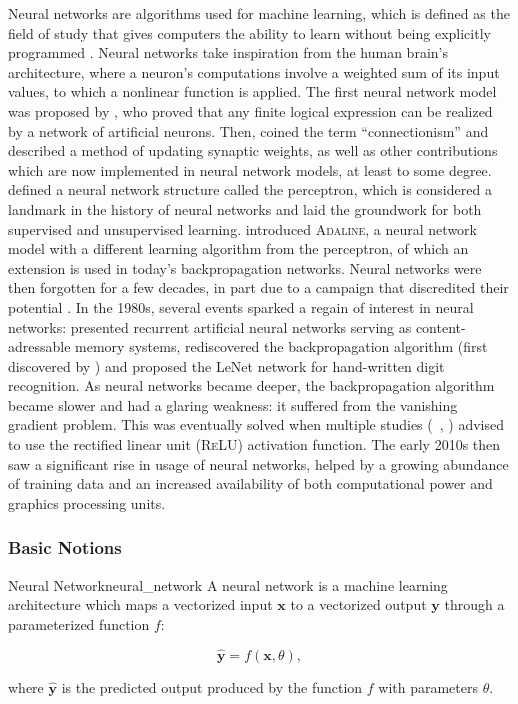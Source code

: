 Neural networks are algorithms used for machine learning, which is defined as the field of study that gives computers the ability to learn without being explicitly programmed \citep{samuel1959machine}. Neural networks take inspiration from the human brain's architecture, where a neuron's computations involve a weighted sum of its input values, to which a nonlinear function is applied. The first neural network model was proposed by \citet{mcculloch1943logical}, who proved that any finite logical expression can be realized by a network of artificial neurons. Then, \citet{hebb1949organization} coined the term ``connectionism'' and described a method of updating synaptic weights, as well as other contributions which are now implemented in neural network models, at least to some degree. \citet{rosenblatt1958perceptron} defined a neural network structure called the perceptron, which is considered a landmark in the history of neural networks and laid the groundwork for both supervised and unsupervised learning. \citet{widrow1960adaptive} introduced \textsc{Adaline}, a neural network model with a different learning algorithm from the perceptron, of which an extension is used in today's backpropagation networks. Neural networks were then forgotten for a few decades, in part due to a campaign that discredited their potential \citep{minsky1969introduction}. In the 1980s, several events sparked a regain of interest in neural networks: \citet{hopfield1982neural} presented recurrent artificial neural networks serving as content-adressable memory systems, \citet{rumelhart1985learning} rediscovered the backpropagation algorithm (first discovered by \citet{werbos1974beyond}) and \cite{le1989handwritten} proposed the LeNet network for hand-written digit recognition. As neural networks became deeper, the backpropagation algorithm became slower and had a glaring weakness: it suffered from the vanishing gradient problem. This was eventually solved when multiple studies (\eg\ \citet{nair2010rectified}, \citet{glorot2011deep}) advised to use the rectified linear unit (\textsc{ReLU}) activation function. The early 2010s then saw a significant rise in usage of neural networks, helped by a growing abundance of training data and an increased availability of both computational power and graphics processing units.

\subsubsection{Basic Notions}
\begin{defi}{Neural Network}{neural_network}
A neural network is a machine learning architecture which maps a vectorized input $\mathbf{x}$ to a vectorized output $\mathbf{y}$ through a parameterized function $f$:

\[ \hat{\mathbf{y}} = f(\mathbf{x}, \theta) , \]

where $\hat{\mathbf{y}}$ is the predicted output produced by the function $f$ with parameters $\theta$.
\end{defi}

